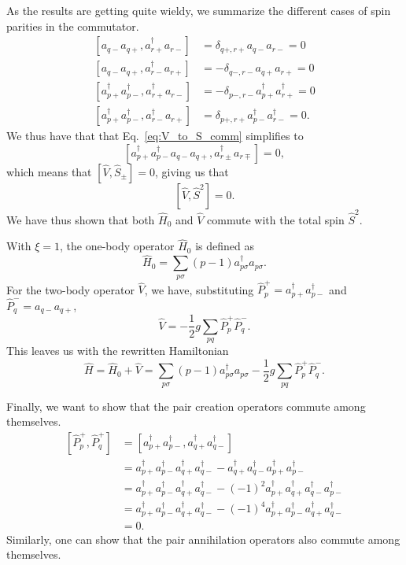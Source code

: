 As the results are getting quite wieldy, we summarize the different cases of spin parities in the commutator.
\begin{align*}
    \left[ a_{q-} a_{q+}, a^\dag_{r+} a_{r-} \right] &= \delta_{q+, r+} a_{q-} a_{r-} = 0 \\
    \left[ a_{q-} a_{q+}, a^\dag_{r-} a_{r+} \right] &= -\delta_{q-, r-} a_{q+} a_{r+} = 0 \\
    \left[ a_{p+}^\dagger a_{p-}^\dagger, a^\dag_{r+} a_{r-} \right] &= - \delta_{p-, r-} a_{p+}^\dagger a^\dag_{r+} = 0 \\
    \left[ a_{p+}^\dagger a_{p-}^\dagger, a^\dag_{r-} a_{r+} \right] &= \delta_{p+, r+} a_{p-}^\dagger a^\dag_{r-} = 0.
\end{align*}
We thus have that that Eq.~\eqref{eq:V_to_S_comm} simplifies to
\begin{equation*}
    \left[ a_{p+}^\dagger a_{p-}^\dagger a_{q-} a_{q+}, a^\dag_{r\pm} a_{r\mp} \right] = 0,
\end{equation*}
which means that $\left[ \hat{V}, \hat{S}_\pm \right] = 0$, giving us that
\begin{equation*}
    \left[ \hat{V}, \hat{S}^2 \right] = 0.
\end{equation*}
We have thus shown that both $\hat{H}_0$ and $\hat{V}$ commute with the total spin $\hat{S}^2$.

With $\xi = 1$, the one-body operator $\hat{H}_0$ is defined as
\begin{equation*}
    \hat{H}_0 = \sum_{p\sigma} (p-1) a_{p\sigma}^{\dagger} a_{p\sigma}.
\end{equation*}
For the two-body operator $\hat{V}$, we have, substituting $\hat{P}^{+}_p = a_{p+}^\dagger a_{p-}^\dagger$ and $\hat{P}^{-}_q = a_{q-} a_{q+}$,
\begin{equation*}
    \hat{V} = - \frac{1}{2} g \sum_{pq} \hat{P}^{+}_p \hat{P}^{-}_q.
\end{equation*}
This leaves us with the rewritten Hamiltonian
\begin{equation*}
    \hat{H} = \hat{H}_0 + \hat{V} = \sum_{p\sigma} (p-1) a_{p\sigma}^{\dagger} a_{p\sigma} - \frac{1}{2} g \sum_{pq} \hat{P}^{+}_p \hat{P}^{-}_q.
\end{equation*}

Finally, we want to show that the pair creation operators commute among themselves.
\begin{align*}
    \left[ \hat{P}^{+}_p, \hat{P}^{+}_q \right]
    &= \left[ a_{p+}^\dagger a_{p-}^\dagger, a_{q+}^\dagger a_{q-}^\dagger \right] \\
    &= a_{p+}^\dagger a_{p-}^\dagger a_{q+}^\dagger a_{q-}^\dagger - a_{q+}^\dagger a_{q-}^\dagger a_{p+}^\dagger a_{p-}^\dagger \\
    &= a_{p+}^\dagger a_{p-}^\dagger a_{q+}^\dagger a_{q-}^\dagger - (-1)^2 a_{p+}^\dagger a_{q+}^\dagger a_{q-}^\dagger a_{p-}^\dagger \\
    &= a_{p+}^\dagger a_{p-}^\dagger a_{q+}^\dagger a_{q-}^\dagger - (-1)^4 a_{p+}^\dagger a_{p-}^\dagger a_{q+}^\dagger a_{q-}^\dagger \\
    &= 0.
\end{align*}
Similarly, one can show that the pair annihilation operators also commute among themselves.
